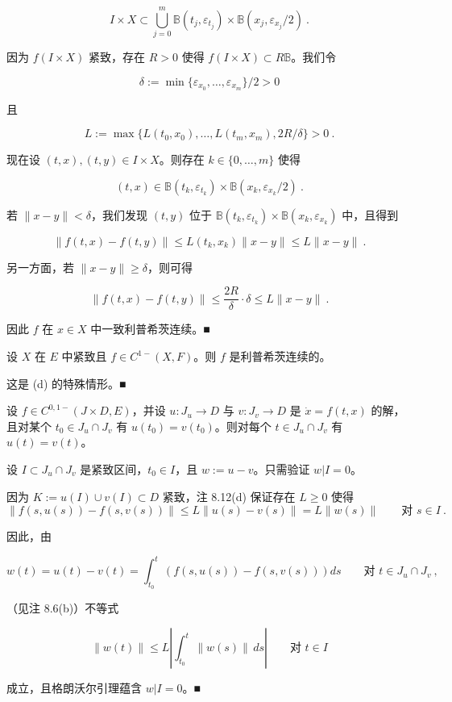 \begin{remark}
\begin{items}
\[
I\times X\subset\bigcup_{j=0}^{m}\mathbb{B}(t_{j},\varepsilon_{t_{j}})\times\mathbb{B}(x_{j},\varepsilon_{x_{j}}/2) \ .
\]

因为 $ f(I\times X) $ 紧致，存在 $ R>0 $ 使得 $ f(I\times X)\subset R\mathbb{B} $。我们令

\[
\delta:=\min\{\varepsilon_{x_{0}},\ldots,\varepsilon_{x_{m}}\}/2>0
\]

且

\[
L:=\max\{L(t_{0},x_{0}),\ldots,L(t_{m},x_{m}),2R/\delta\}>0 \ .
\]

现在设 $ (t,x),(t,y)\in I\times X $。则存在 $ k\in\{0,\ldots,m\} $ 使得

\[
(t,x)\in\mathbb{B}(t_{k},\varepsilon_{t_{k}})\times\mathbb{B}(x_{k},\varepsilon_{x_{k}}/2) \ .
\]

若 $ \|x-y\|<\delta $，我们发现 $ (t,y) $ 位于 $ \mathbb{B}(t_{k},\varepsilon_{t_{k}})\times\mathbb{B}(x_{k},\varepsilon_{x_{k}}) $ 中，且得到

\[
\|f(t,x)-f(t,y)\|\le L(t_{k},x_{k})\|x-y\|\le L\|x-y\| \ .
\]

另一方面，若 $ \|x-y\|\ge\delta $，则可得

\[
\|f(t,x)-f(t,y)\|\le\frac{2R}{\delta}\cdot\delta\le L\|x-y\| \ .
\]

因此 $ f $ 在 $ x\in X $ 中一致利普希茨连续。\nobreak\hspace{0.35em}■

\item

设 $ X $ 在 $ E $ 中紧致且 $ f\in C^{1-}(X,F) $。则 $ f $ 是利普希茨连续的。

\proofhead
这是 (d) 的特殊情形。\nobreak\hspace{0.35em}■
\end{items}

\end{remark}

\begin{theorem}

设 $ f\in C^{0,1-}(J\times D,E) $，并设 $ u:J_{u}\to D $ 与 $ v:J_{v}\to D $ 是 $ \dot{x}=f(t,x) $ 的解，且对某个 $ t_{0}\in J_{u}\cap J_{v} $ 有 $ u(t_{0})=v(t_{0}) $。则对每个 $ t\in J_{u}\cap J_{v} $ 有 $ u(t)=v(t) $。

\proofhead
设 $ I\subset J_{u}\cap J_{v} $ 是紧致区间，$ t_{0}\in I $，且 $ w:=u-v $。只需验证 $ w|I=0 $。

因为 $ K:=u(I)\cup v(I)\subset D $ 紧致，注 8.12(d) 保证存在 $ L\ge 0 $ 使得
\[
\|f(s,u(s))-f(s,v(s))\|\le L\|u(s)-v(s)\|=L\|w(s)\|\qquad\text{对 }s\in I \ .
\]

因此，由

\[
w(t)=u(t)-v(t)=\int_{t_{0}}^{t}\left(f(s,u(s))-f(s,v(s))\right)ds\qquad\text{对 }t\in J_{u}\cap J_{v}\ ,
\]

（见注 8.6(b)）不等式

\[
\|w(t)\|\le L\left|\int_{t_{0}}^{t}\|w(s)\|\,ds\right|\qquad\text{对 }t\in I
\]

成立，且格朗沃尔引理蕴含 $ w|I=0 $。\nobreak\hspace{0.35em}■

\end{theorem}

